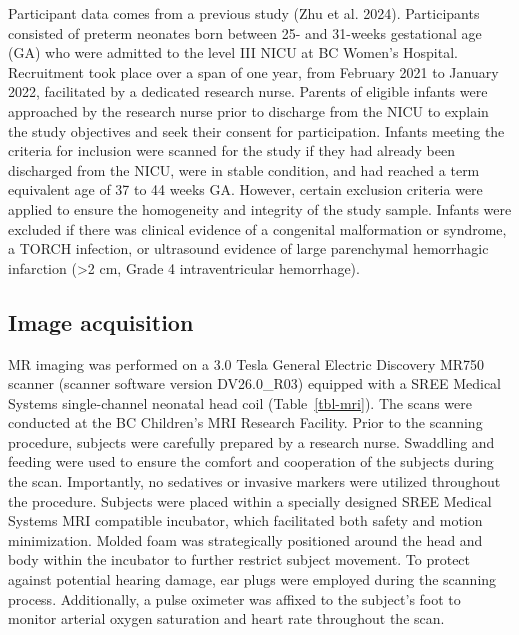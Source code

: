 \documentclass[
sn-nature
]{sn-jnl}
\begin{document}
Participant data comes from a previous study (Zhu et al. 2024).
Participants consisted of preterm neonates born between 25- and 31-weeks
gestational age (GA) who were admitted to the level III NICU at BC
Women's Hospital. Recruitment took place over a span of one year, from
February 2021 to January 2022, facilitated by a dedicated research
nurse. Parents of eligible infants were approached by the research nurse
prior to discharge from the NICU to explain the study objectives and
seek their consent for participation. Infants meeting the criteria for
inclusion were scanned for the study if they had already been discharged
from the NICU, were in stable condition, and had reached a term
equivalent age of 37 to 44 weeks GA. However, certain exclusion criteria
were applied to ensure the homogeneity and integrity of the study
sample. Infants were excluded if there was clinical evidence of a
congenital malformation or syndrome, a TORCH infection, or ultrasound
evidence of large parenchymal hemorrhagic infarction (\textgreater2 cm,
Grade 4 intraventricular hemorrhage).

\subsection{Image acquisition}\label{image-acquisition}

MR imaging was performed on a 3.0 Tesla General Electric Discovery MR750
scanner (scanner software version DV26.0\_R03) equipped with a SREE
Medical Systems single-channel neonatal head coil (Table~\ref{tbl-mri}).
The scans were conducted at the BC Children's MRI Research Facility.
Prior to the scanning procedure, subjects were carefully prepared by a
research nurse. Swaddling and feeding were used to ensure the comfort
and cooperation of the subjects during the scan. Importantly, no
sedatives or invasive markers were utilized throughout the procedure.
Subjects were placed within a specially designed SREE Medical Systems
MRI compatible incubator, which facilitated both safety and motion
minimization. Molded foam was strategically positioned around the head
and body within the incubator to further restrict subject movement. To
protect against potential hearing damage, ear plugs were employed during
the scanning process. Additionally, a pulse oximeter was affixed to the
subject's foot to monitor arterial oxygen saturation and heart rate
throughout the scan.
\end{document}
